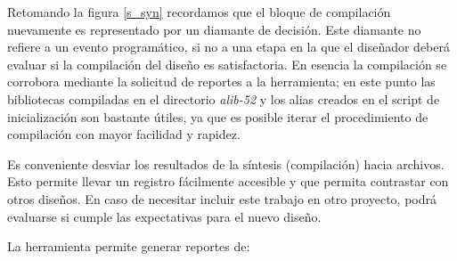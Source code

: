 Retomando la figura \ref{s_syn} recordamos que el bloque de compilación nuevamente es representado por un diamante de decisión. Este diamante no refiere a un evento programático, si no a una etapa en la que el diseñador deberá evaluar si la compilación del diseño es satisfactoria. En esencia la compilación se corrobora mediante la solicitud de reportes a la herramienta; en este punto las bibliotecas compiladas en el directorio \textit{alib-52} y los alias creados en el script de inicialización son bastante útiles, ya que es posible iterar el procedimiento de compilación con mayor facilidad y rapidez.

Es conveniente desviar los resultados de la síntesis (compilación) hacia archivos. Esto permite llevar un registro fácilmente accesible y que permita contrastar con otros diseños. En caso de necesitar incluir este trabajo en otro proyecto, podrá evaluarse si cumple las expectativas para el nuevo diseño.

La herramienta permite generar reportes de:

